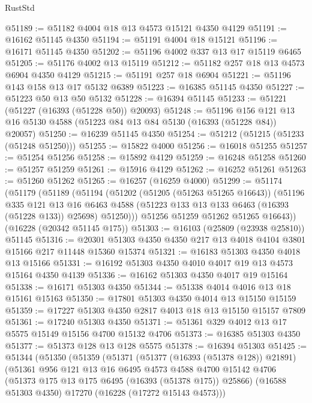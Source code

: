 \begin{lexlean}{RustStd}
\begin{coremodule}
@51189 := @51182 @4004 @18 @13 @4573 @15121 @4350 @4129
@51191 := @16162 @51145 @4350
@51194 := @51191 @4004 @18 @15121
@51196 := @16171 @51145 @4350
@51202 := @51196 @4002 @337 @13 @17 @15119 @6465
@51205 := @51176 @4002 @13 @15119
@51212 := @51182 @257 @18 @13 @4573 @6904 @4350 @4129
@51215 := @51191 @257 @18 @6904
@51221 := @51196 @143 @158 @13 @17 @5132 @6389
@51223 := @16385 @51145 @4350
@51227 := @51223 @50 @13 @50 @5132
@51228 := @16394 @51145
@51233 := @51221 (@51227 (@16393 (@51228 @50)) @20093)
@51248 := @51196
    @156
    @121
    @13
    @16
    @5130
    @4588
    (@51223 @84 @13 @84 @5130 (@16393 (@51228 @84)) @20057)
@51250 := @16239 @51145 @4350
@51254 := @51212 (@51215 (@51233 (@51248 @51250)))
@51255 := @15822 @4000
@51256 := @16018 @51255
@51257 := @51254 @51256
@51258 := @15892 @4129
@51259 := @16248 @51258
@51260 := @51257 @51259
@51261 := @15916 @4129
@51262 := @16252 @51261
@51263 := @51260 @51262
@51265 := @16257 (@16259 @4000)
@51299 := @51174
    (@51179
      (@51189
        (@51194
          (@51202
            (@51205 (@51263 @51265 @16643))
            (@51196
              @335
              @121
              @13
              @16
              @6463
              @4588
              (@51223 @133 @13 @133 @6463 (@16393 (@51228 @133)) @25698)
              @51250)))
        @51256
        @51259
        @51262
        @51265
        @16643))
    (@16228 (@20342 @51145 @175))
@51303 := @16103 (@25809 (@23938 @25810)) @51145
@51316 := @20301 @51303 @4350 @4350 @217 @13 @4018 @4104 @3801 @15166 @217 @11448 @15360 @15374
@51321 := @16183 @51303 @4350 @4018 @13 @15166
@51331 := @16192 @51303 @4350 @4010 @4017 @19 @13 @4573 @15164 @4350 @4139
@51336 := @16162 @51303 @4350 @4017 @19 @15164
@51338 := @16171 @51303 @4350
@51344 := @51338 @4014 @4016 @13 @18 @15161 @15163
@51350 := @17801 @51303 @4350 @4014 @13 @15150 @15159
@51359 := @17227 @51303 @4350 @2817 @4013 @18 @13 @15150 @15157 @7809
@51361 := @17240 @51303 @4350
@51371 := @51361 @329 @4012 @13 @17 @5575 @15149 @15156 @4700 @15132 @4706
@51373 := @16385 @51303 @4350
@51377 := @51373 @128 @13 @128 @5575
@51378 := @16394 @51303
@51425 := @51344
    (@51350
      (@51359
        (@51371
          (@51377 (@16393 (@51378 @128)) @21891)
          (@51361
            @956
            @121
            @13
            @16
            @6495
            @4573
            @4588
            @4700
            @15142
            @4706
            (@51373 @175 @13 @175 @6495 (@16393 (@51378 @175)) @25866)
            (@16588 @51303 @4350)
            @17270
            (@16228 (@17272 @15143 @4573)))

\end{coremodule}
\end{lexlean}
